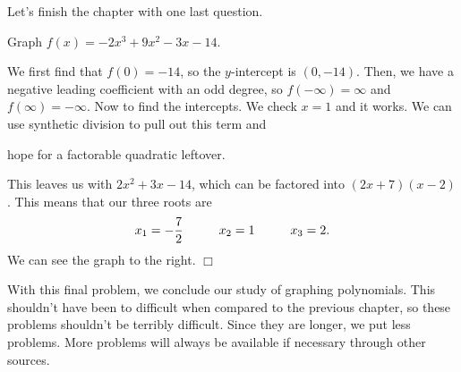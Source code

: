 \documentclass[lang=en,11pt]{elegantbook}
\begin{document}
Let's finish the chapter with one last question.
\begin{example}
Graph $f(x)=-2x^3+9x^2-3x-14$.
\end{example}
\begin{solution}
We first find that $f(0)=-14$, so the $y$-intercept is $(0,-14)$.  Then, we have a negative leading coefficient with an odd degree, so $f(-\infty)=\infty$ and $f(\infty)=-\infty$. Now to find the intercepts.  We check $x=1$ and it works.  We can use synthetic division to pull out this term and 
\end{solution}

\begin{wrapfigure}{r}{5cm}
\end{wrapfigure}

\noindent hope for a factorable quadratic leftover.


\noindent This leaves us with $2x^2+3x-14$, which can be factored into $(2x+7)(x-2)$.  This means that our three roots are $$x_1=-\dfrac{7}{2}\hspace{10mm} x_2=1\hspace{10mm} x_3=2.$$ We can see the graph to the right. $\Box$

With this final problem, we conclude our study of graphing polynomials.  This shouldn't have been to difficult when compared to the previous chapter, so these problems shouldn't be terribly difficult.  Since they are longer, we put less problems.  More problems will always be available if necessary through other sources.
\end{document}
